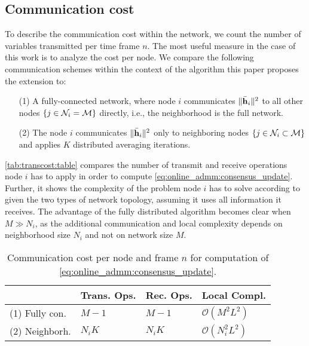 \documentclass{article}
\begin{document}
\subsection[]{Communication cost}
\label{sec:transcost}
To describe the communication cost within the network, we count the number of variables transmitted per time frame \(n\).
The most useful measure in the case of this work is to analyze the cost per node.
We compare the following communication schemes within the context of the algorithm \cite{blochbergerDBSI} this paper proposes the extension to:
\begin{itemize}
    \itemsep-0.2em
    \item[(1)] A fully-connected network, where node \(i\) communicates \(\|\bar{\bm{\mathrm{h}}}_i\|^2\) to all other nodes \(\{j \in \mathcal{N}_i = \mathcal{M}\}\) directly, i.e., the neighborhood is the full network.
    \item[(2)] The node \(i\) communicates \(\|\bar{\bm{\mathrm{h}}}_i\|^2\) only to neighboring nodes \(\{j \in \mathcal{N}_i \subset \mathcal{M}\}\) and applies \(K\) distributed averaging iterations.
\end{itemize}
\autoref{tab:transcost:table} compares the number of transmit and receive operations node \(i\) has to apply in order to compute \eqref{eq:online_admm:consensus_update}.
Further, it shows the complexity of the problem node \(i\) has to solve according to \cite{blochbergerDBSI} given the two types of network topology, assuming it uses all information it receives.
The advantage of the fully distributed algorithm becomes clear when \(M \gg N_i\), as the additional communication and local complexity depends on neighborhood size \(N_i\) and not on network size \(M\).
\vspace*{-0.6em}
\renewcommand{\arraystretch}{1.2}
\begin{table}[h]
    \centering
    \begin{tabular}{ |l|l|l|l| }
        \hline
        & Trans. Ops. & Rec. Ops. & Local Compl. \\
        \hline\hline
        (1) Fully con. & \(M-1\) & \(M-1\) & \(\mathcal{O}(M^2 L^2)\) \\
        \hline
        (2) Neighborh. & \(N_i K\) & \(N_i K\) & \(\mathcal{O}(N_i^2 L^2)\)\\ 
        \hline
    \end{tabular}
    \caption[]{Communication cost per node and frame \(n\) for computation of \eqref{eq:online_admm:consensus_update}.}
    \label{tab:transcost:table}
\end{table}
\renewcommand{\arraystretch}{1.0}
\end{document}
